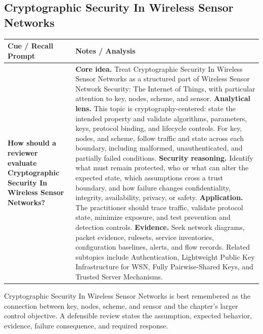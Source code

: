 \documentclass[11pt]{article}
\newcommand{\CornellHeader}{%
\rowcolor{Navy}\color{white}\bfseries Cue / Recall Prompt & \color{white}\bfseries Notes / Analysis\\\hline}
\newcommand{\CornellRow}[2]{%
\cellcolor{CueGray}\RaggedRight\textbf{#1} & \RaggedRight #2\\\hline}
\begin{document}
\subsection*{Cryptographic Security In Wireless Sensor Networks}
\begin{longtable}{>{\RaggedRight\arraybackslash}p{}|>{\RaggedRight\arraybackslash}p{}}
\CornellHeader
\CornellRow{How should a reviewer evaluate Cryptographic Security In Wireless Sensor Networks?}{\textbf{Core idea.} Treat Cryptographic Security In Wireless Sensor Networks as a structured part of Wireless Sensor Network Security: The Internet of Things, with particular attention to key, nodes, scheme, and sensor. \textbf{Analytical lens.} This topic is cryptography-centered: state the intended property and validate algorithms, parameters, keys, protocol binding, and lifecycle controls. For key, nodes, and scheme, follow traffic and state across each boundary, including malformed, unauthenticated, and partially failed conditions. \textbf{Security reasoning.} Identify what must remain protected, who or what can alter the expected state, which assumptions cross a trust boundary, and how failure changes confidentiality, integrity, availability, privacy, or safety. \textbf{Application.} The practitioner should trace traffic, validate protocol state, minimize exposure, and test prevention and detection controls. \textbf{Evidence.} Seek network diagrams, packet evidence, rulesets, service inventories, configuration baselines, alerts, and flow records. Related subtopics include Authentication, Lightweight Public Key Infrastructure for WSN, Fully Pairwise-Shared Keys, and Trusted Server Mechanisms.}
\end{longtable}
\begin{topicsummary}
Cryptographic Security In Wireless Sensor Networks is best remembered as the connection between key, nodes, scheme, and sensor and the chapter's larger control objective. A defensible review states the assumption, expected behavior, evidence, failure consequence, and required response.
\end{topicsummary}
\end{document}
